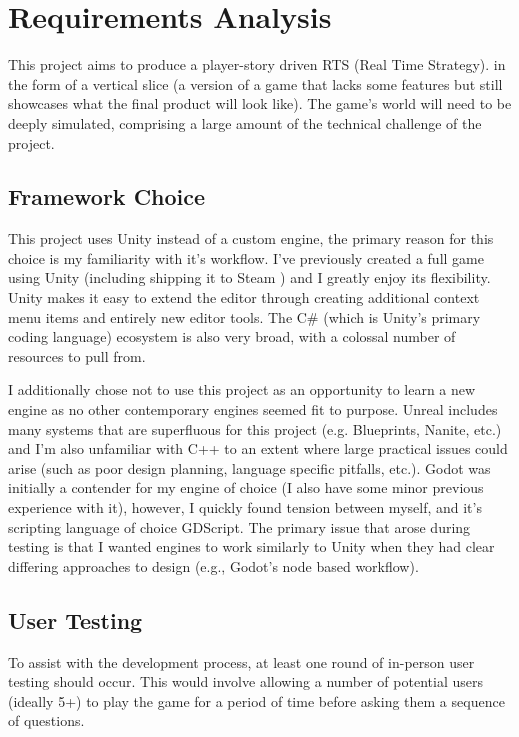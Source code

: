 \documentclass{report}
\begin{document}
\chapter{Requirements Analysis}

This project aims to produce a player-story driven RTS (Real Time Strategy). in the form of a vertical slice (a version of a game that lacks some features but still showcases what the final product will look like). The game's world will need to be deeply simulated, comprising a large amount of the technical challenge of the project.

\section{Framework Choice}
This project uses Unity \cite{unity} instead of a custom engine, the primary reason for this choice is my familiarity with it's workflow. I've previously created a full game using Unity (including shipping it to Steam \cite{steam}) and I greatly enjoy its flexibility. Unity makes it easy to extend the editor through creating additional context menu items and entirely new editor tools. 
The C\# (which is Unity's primary coding language) ecosystem is also very broad, with a colossal number of resources to pull from. 

I additionally chose not to use this project as an opportunity to learn a new engine as no other contemporary engines seemed fit to purpose. Unreal \cite{unreal} includes many systems that are superfluous for this project (e.g. Blueprints, Nanite, etc.) and I'm also unfamiliar with C++ to an extent where large practical issues could arise (such as poor design planning, language specific pitfalls, etc.). Godot \cite{godot} was initially a contender for my engine of choice (I also have some minor previous experience with it), however, I quickly found tension between myself, and it's scripting language of choice GDScript. The primary issue that arose during testing is that I wanted engines to work similarly to Unity when they had clear differing approaches to design (e.g., Godot's node based workflow).

\section{User Testing}
To assist with the development process, at least one round of in-person user testing should occur. This would involve allowing a number of potential users (ideally 5+) to play the game for a period of time before asking them a sequence of questions.
\end{document}
